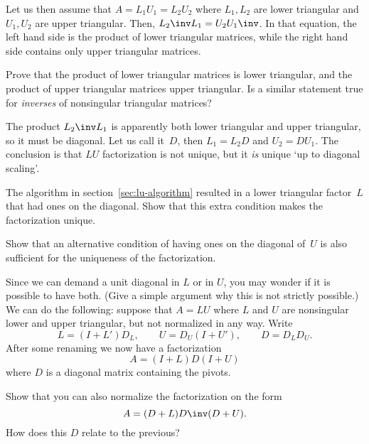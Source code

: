 Let us then assume that $A=L_1U_1=L_2U_2$ where $L_1,L_2$ are lower
triangular and $U_1,U_2$ are upper triangular.
Then, $L_2\inv L_1=U_2U_1\inv$.
In that equation, the left hand side is the product
of lower triangular matrices, while the right hand side contains only
upper triangular matrices.

\begin{exercise}
  Prove that the product of lower triangular matrices is lower
  triangular, and the product of upper triangular matrices upper
  triangular. Is a similar statement true for
  \emph{inverses}
  of nonsingular  triangular matrices?
\end{exercise}

The product $L_2\inv L_1$ is apparently both lower triangular and
upper triangular, so it must be diagonal. Let us call it~$D$, then
$L_1=L_2D$ and $U_2=DU_1$. The conclusion is that $LU$ factorization
is not unique, but it \emph{is} unique `up to diagonal scaling'.

\begin{exercise}
  The algorithm in section~\ref{sec:lu-algorithm} resulted in a lower
  triangular factor~$L$ that had ones on the diagonal. Show that this
  extra condition makes the factorization unique.
\end{exercise}
\begin{exercise}
  Show that an alternative condition of having ones on the diagonal of~$U$
  is also sufficient for the uniqueness of the factorization.
\end{exercise}

Since we can demand a unit diagonal in $L$ or in $U$, you may wonder
if it is possible to have both. (Give a simple argument why this is
not strictly possible.) We can do the following: suppose that $A=LU$
where $L$ and
$U$ are nonsingular lower and upper triangular, but not normalized in any
way. Write \[ L=(I+L')D_L,\qquad U=D_U(I+U'),\qquad D=D_LD_U. \]
After some renaming we now have a factorization
\begin{equation}
  A=(I+L)D(I+U)
  \label{eq:A=LUnormalized}
\end{equation}
where $D$ is a diagonal matrix containing the pivots.

\begin{exercise}
  Show that you can also normalize the factorization on the form
  \[ A=(D+L)D\inv (D+U). \]
  How does this $D$ relate to the previous?
\end{exercise}


